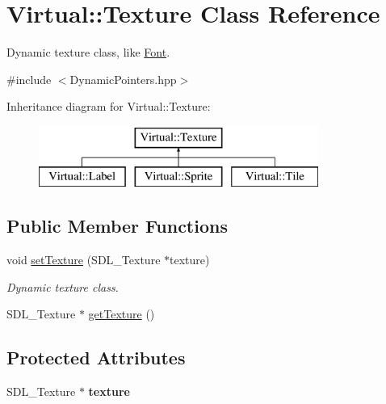 \hypertarget{class_virtual_1_1_texture}{}\section{Virtual\+:\+:Texture Class Reference}
\label{class_virtual_1_1_texture}


Dynamic texture class, like \hyperlink{class_virtual_1_1_font}{Font}.  




{\ttfamily \#include $<$Dynamic\+Pointers.\+hpp$>$}

Inheritance diagram for Virtual\+:\+:Texture\+:\begin{figure}[H]
\begin{center}
\leavevmode
\includegraphics[height=2.000000cm]{class_virtual_1_1_texture}
\end{center}
\end{figure}
\subsection*{Public Member Functions}
\begin{DoxyCompactItemize}
\item 
void \hyperlink{class_virtual_1_1_texture_a8e0ffa6f92bfb5afab975a59f2b3b92f}{set\+Texture} (S\+D\+L\+\_\+\+Texture $\ast$texture)
\begin{DoxyCompactList}\small\item\em Dynamic texture class. \end{DoxyCompactList}\item 
S\+D\+L\+\_\+\+Texture $\ast$ \hyperlink{class_virtual_1_1_texture_a5c870d3c9b6db63922aa5cf451cd3422}{get\+Texture} ()
\end{DoxyCompactItemize}
\subsection*{Protected Attributes}
\begin{DoxyCompactItemize}
\item 
\hypertarget{class_virtual_1_1_texture_ae0101cbb0799e438722a16da7f25653a}{}\label{class_virtual_1_1_texture_ae0101cbb0799e438722a16da7f25653a} 
S\+D\+L\+\_\+\+Texture $\ast$ {\bfseries texture}
\end{DoxyCompactItemize}


